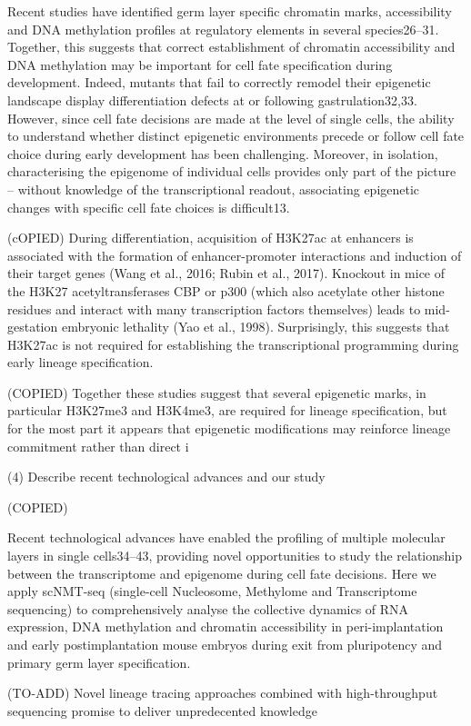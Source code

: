 Recent studies have identified germ layer specific chromatin marks, accessibility and DNA methylation profiles at regulatory elements in several species26–31. Together, this suggests that correct establishment of chromatin accessibility and DNA methylation may be important for cell fate specification during development. Indeed, mutants that fail to correctly remodel their epigenetic landscape display differentiation defects at or following gastrulation32,33. However, since cell fate decisions are made at the level of single cells, the ability to understand whether distinct epigenetic environments precede or follow cell fate choice during early development has been challenging. Moreover, in isolation, characterising the epigenome of individual cells provides only part of the picture – without knowledge of the transcriptional readout, associating epigenetic changes with specific cell fate choices is difficult13.


	

	(cOPIED) During differentiation, acquisition of H3K27ac at enhancers is associated with the formation of enhancer-promoter interactions and induction of their target genes (Wang et al., 2016; Rubin et al., 2017). Knockout in mice of the H3K27 acetyltransferases CBP or p300 (which also acetylate other histone residues and interact with many transcription factors themselves) leads to mid-gestation embryonic lethality (Yao et al., 1998). Surprisingly, this suggests that H3K27ac is not required for establishing the transcriptional programming during early lineage specification.

	(COPIED) Together these studies suggest that several epigenetic marks, in particular H3K27me3 and H3K4me3, are required for lineage specification, but for the most part it appears that epigenetic modifications may reinforce lineage commitment rather than direct i


(4) Describe recent technological advances and our study

(COPIED)




Recent technological advances have enabled the profiling of multiple molecular layers in single cells34–43, providing novel opportunities to study the relationship between the transcriptome and epigenome during cell fate decisions. Here we apply scNMT-seq (single-cell Nucleosome, Methylome and Transcriptome sequencing) to comprehensively analyse the collective dynamics of RNA expression, DNA methylation and chromatin accessibility in peri-implantation and early postimplantation mouse embryos during exit from pluripotency  and primary germ layer specification. 



(TO-ADD) Novel lineage tracing approaches combined with high-throughput sequencing promise to deliver unpredecented knowledge